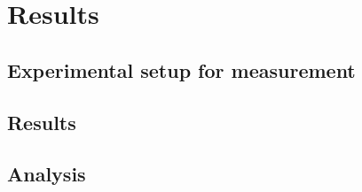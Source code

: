\documentclass[../report.tex]{subfiles}
\begin{document}
	
\chapter{Results}

	\section{Experimental setup for measurement}
	
	\section{Results}
	
	\section{Analysis}
	
\end{document}
